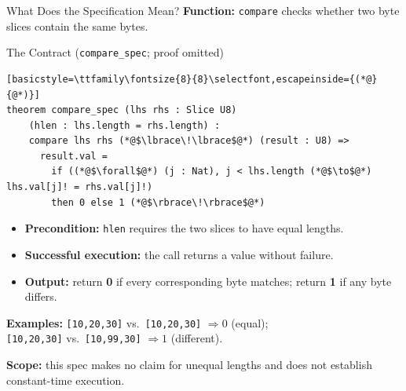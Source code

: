 \documentclass[aspectratio=169,xcolor=dvipsnames]{beamer}
\begin{document}
\begin{frame}[fragile]{What Does the Specification Mean?}
    \footnotesize
    \textbf{Function:} \texttt{compare} checks whether two byte slices contain the same bytes.
    \begin{block}{The Contract (\texttt{compare\_spec}; proof omitted)}
\begin{lstlisting}[basicstyle=\ttfamily\fontsize{8}{8}\selectfont,escapeinside={(*@}{@*)}]
theorem compare_spec (lhs rhs : Slice U8)
    (hlen : lhs.length = rhs.length) :
    compare lhs rhs (*@$\lbrace\!\lbrace$@*) (result : U8) =>
      result.val =
        if ((*@$\forall$@*) (j : Nat), j < lhs.length (*@$\to$@*) lhs.val[j]! = rhs.val[j]!)
        then 0 else 1 (*@$\rbrace\!\rbrace$@*)
\end{lstlisting}
    \end{block}
    \begin{itemize}
        \item \textbf{Precondition:} \texttt{hlen} requires the two slices to have equal lengths.
        \item \textbf{Successful execution:} the call returns a value without failure.
        \item \textbf{Output:} return \textbf{0} if every corresponding byte matches;
              return \textbf{1} if any byte differs.
    \end{itemize}
    \textbf{Examples:} \texttt{[10,20,30]} vs.\ \texttt{[10,20,30]} $\Rightarrow 0$ (equal);\\
    \hspace*{1.6cm}\texttt{[10,20,30]} vs.\ \texttt{[10,99,30]} $\Rightarrow 1$ (different).


    \textbf{Scope:} this spec makes no claim for unequal lengths and does not establish constant-time execution.
\end{frame}
\end{document}
